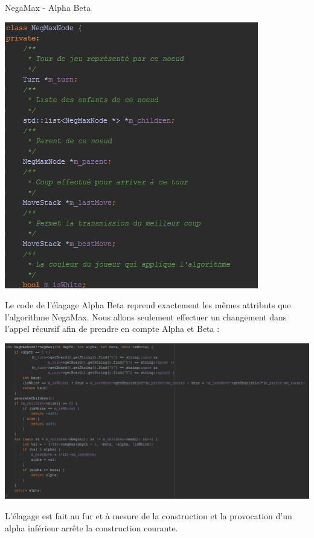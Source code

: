 \documentclass[a4paper]{article}
\makeatletter
\renewcommand{\section}{\@startsection{section}{1}{\z@}
{-4ex \@plus -1ex \@minus -.4ex}
{1ex \@plus.2ex }
{\normalfont\large\sffamily\bfseries}}
\makeatother
\begin{document}
\section{NegaMax - Alpha Beta}
\begin{center}
\includegraphics[scale=1]{ressources/AB.png}
\end{center}

Le code de l'élagage Alpha Beta reprend exactement les mêmes attributs que l'algorithme NegaMax. Nous allons seulement effectuer un changement dans l'appel récursif afin de prendre en compte Alpha et Beta :

\begin{center}
\includegraphics[scale=.5]{ressources/ABShow.png}
\end{center}

L'élagage est fait au fur et à mesure de la construction et la provocation d'un alpha inférieur arrête la construction courante.
\newpage
\end{document}
